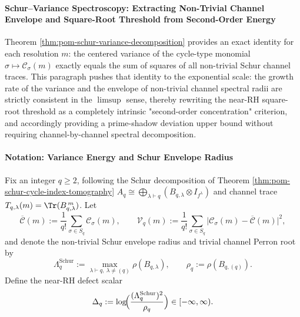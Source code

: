 
\paragraph{Schur--Variance Spectroscopy: Extracting Non-Trivial Channel Envelope and Square-Root Threshold from Second-Order Energy}
Theorem \ref{thm:pom-schur-variance-decomposition} provides an exact identity for each resolution \(m\): the centered variance of the cycle-type monomial
\(\sigma\mapsto \mathcal C_\sigma(m)\) exactly equals the sum of squares of all non-trivial Schur channel traces.
This paragraph pushes that identity to the exponential scale: the growth rate of the variance and the envelope of non-trivial channel spectral radii are strictly consistent in the \(\limsup\) sense,
thereby rewriting the near-RH square-root threshold as a completely intrinsic "second-order concentration" criterion,
and accordingly providing a prime-shadow deviation upper bound without requiring channel-by-channel spectral decomposition.

\paragraph{Notation: Variance Energy and Schur Envelope Radius}
Fix an integer \(q\ge 2\), following the Schur decomposition of Theorem \ref{thm:pom-schur-cycle-index-tomography}
\(
A_q\cong\bigoplus_{\lambda\vdash q}(B_{q,\lambda}\otimes I_{f^\lambda})
\)
and channel trace \(T_{q,\lambda}(m)=\Tr(B_{q,\lambda}^{\,m})\).
Let
\[
\overline{\mathcal C}(m):=\frac{1}{q!}\sum_{\sigma\in S_q}\mathcal{C}_\sigma(m),
\qquad
\mathcal V_q(m):=\frac{1}{q!}\sum_{\sigma\in S_q}\bigl|\mathcal{C}_\sigma(m)-\overline{\mathcal C}(m)\bigr|^2,
\]
and denote the non-trivial Schur envelope radius and trivial channel Perron root by
\[
\Lambda_q^{\mathrm{Schur}}
:=\max_{\lambda\vdash q,\ \lambda\neq(q)}\rho(B_{q,\lambda}),
\qquad
\rho_q:=\rho(B_{q,(q)}).
\]
Define the near-RH defect scalar
\[
\Delta_q:=\log\!\Bigl(\frac{(\Lambda_q^{\mathrm{Schur}})^2}{\rho_q}\Bigr)\in[-\infty,\infty).
\]

